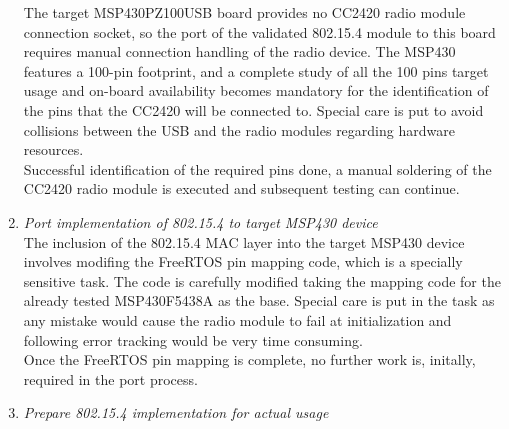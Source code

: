 \begin{enumerate}
		The target MSP430PZ100USB board provides no CC2420 radio module connection socket, so the port of the validated 802.15.4 module to this board requires manual connection handling of the radio device. The MSP430 features a 100-pin footprint, and a complete study of all the 100 pins target usage and on-board availability becomes mandatory for the identification of the pins that the CC2420 will be connected to. Special care is put to avoid collisions between the USB and the radio modules regarding hardware resources.\\

		Successful identification of the required pins done, a manual soldering of the CC2420 radio module is executed and subsequent testing can continue.\\

		\item\emph{Port implementation of 802.15.4 to target MSP430 device}\\

		The inclusion of the 802.15.4 MAC layer into the target MSP430 device involves modifing the FreeRTOS pin mapping code, which is a specially sensitive task. The code is carefully modified taking the mapping code for the already tested MSP430F5438A as the base. Special care is put in the task as any mistake would cause the radio module to fail at initialization and following error tracking would be very time consuming. \\

		Once the FreeRTOS pin mapping is complete, no further work is, initally, required in the port process.\\

		\item\emph{Prepare 802.15.4 implementation for actual usage}\\



\end{enumerate}
